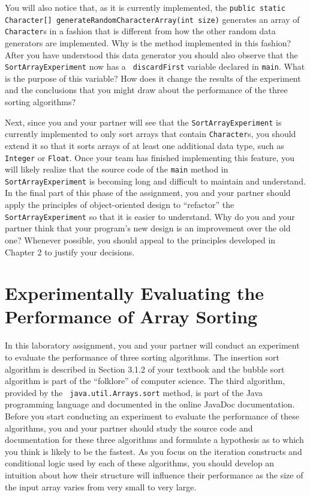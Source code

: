 You will also notice that, as it is currently implemented, the {\tt public static Character[]
generateRandomCharacterArray(int size)} generates an array of {\tt Character}s in a fashion that is different from how
the other random data generators are implemented. Why is the method implemented in this fashion? After you have
understood this data generator you should also observe that the {\tt SortArrayExperiment} now has a {\tt
discardFirst} variable declared in {\tt main}. What is the purpose of this variable? How does it change the results of
the experiment and the conclusions that you might draw about the performance of the three sorting algorithms?

Next, since you and your partner will see that the {\tt SortArrayExperiment} is currently implemented to only sort
arrays that contain {\tt Character}s, you should extend it so that it sorts arrays of at least one additional data type,
such as {\tt Integer} or {\tt Float}. Once your team has finished implementing this feature, you will likely realize
that the source code of the {\tt main} method in {\tt SortArrayExperiment} is becoming long and difficult to maintain
and understand. In the final part of this phase of the assignment, you and your partner should apply the principles of
object-oriented design to ``refactor'' the {\tt SortArrayExperiment} so that it is easier to understand. Why do you and
your partner think that your program's new design is an improvement over the old one?  Whenever possible, you should
appeal to the principles developed in Chapter 2 to justify your decisions.

\section*{Experimentally Evaluating the Performance of Array Sorting}

In this laboratory assignment, you and your partner will conduct an experiment to evaluate the performance of three
sorting algorithms. The insertion sort algorithm is described in Section 3.1.2 of your textbook and the bubble sort
algorithm is part of the ``folklore'' of computer science. The third algorithm, provided by the {\tt
java.util.Arrays.sort} method, is part of the Java programming language and documented in the online JavaDoc
documentation. Before you start conducting an experiment to evaluate the performance of these algorithms, you and your
partner should study the source code and documentation for these three algorithms and formulate a hypothesis as to which
you think is likely to be the fastest. As you focus on the iteration constructs and conditional logic used by each of
these algorithms, you should develop an intuition about how their structure will influence their performance as the size
of the input array varies from very small to very large.

